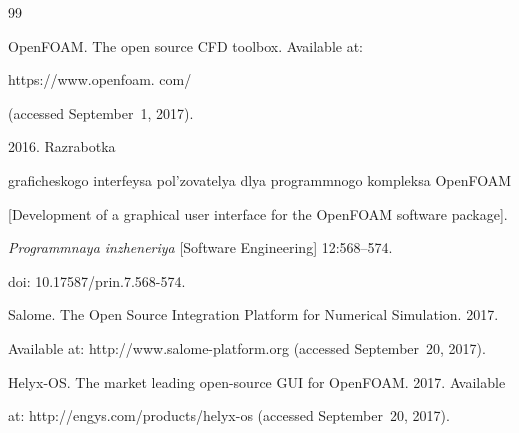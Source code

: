 














\renewcommand{\bibname}{\protect\rmfamily References}







{\small\frenchspacing


{%




\begin{thebibliography}{99}







OpenFOAM. The open source CFD toolbox. Available at:  {\sf 


https://www.openfoam. com/} (accessed September~1, 2017).




 2016. Razrabotka 


graficheskogo interfeysa pol'zovatelya dlya programmnogo kompleksa OpenFOAM 


[Development of a graphical user interface for the OpenFOAM software package]. 


\textit{Programmnaya inzheneriya} [Software Engineering] 12:568--574.


doi: 10.17587/prin.7.568-574.




Salome. The Open Source Integration Platform for Numerical Simulation. 2017. 


Available at: {\sf http://www.salome-platform.org} (accessed September~20, 2017).




Helyx-OS. The market leading open-source GUI for OpenFOAM. 2017. Available 


at: {\sf http://engys.com/products/helyx-os} (accessed September~20, 2017).





\end{thebibliography}}}
